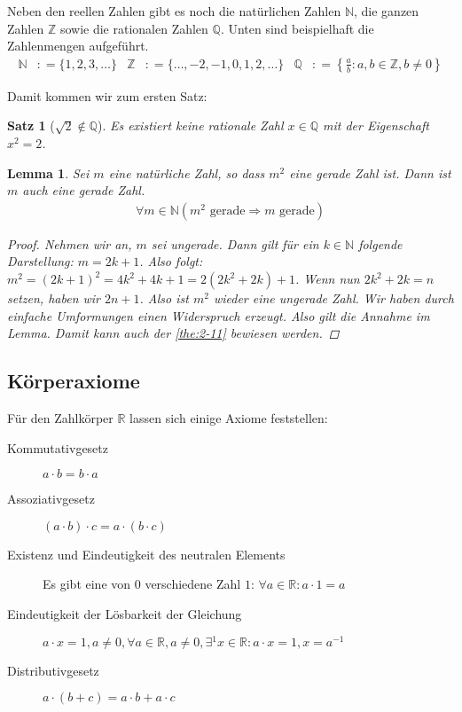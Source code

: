 \documentclass[ngerman,titlepage,twoside, parskip=half*]{scrreprt}
\newcommand*{\N}{\mathbb{N}}
\newcommand*{\Z}{\mathbb{Z}}
\newcommand*{\Q}{\mathbb{Q}}
\newcommand*{\R}{\mathbb{R}}
\theoremstyle{plain}
\newtheorem{lemma}{Lemma}
\newtheorem{theorem}{Satz}[section]
\theoremstyle{definition}
\theoremstyle{remark}
\newcommand*{\coloneqq}{\mathrel{\mathop:}=}
\begin{document}
Neben den reellen Zahlen gibt es noch die natürlichen Zahlen $\N$, die
ganzen Zahlen $\Z$ sowie die rationalen Zahlen $\Q$. Unten sind
beispielhaft die Zahlenmengen aufgeführt.
\begin{align*}
\N &\coloneqq \{1,2,3,\ldots\} &
\Z &\coloneqq \{\ldots ,-2,-1,0,1,2,\ldots\} &
\Q &\coloneqq \left\{\frac{a}{b}\colon a,b\in \Z, b \neq 0\right\}
\end{align*}

Damit kommen wir zum ersten Satz:
\begin{theorem}[$\sqrt{2}\notin \Q$]
  \label{the:2-11}
  Es existiert keine rationale Zahl $x\in \Q$ mit der Eigenschaft
  $x^2=2$.
\end{theorem}

\begin{lemma}
  Sei $m$ eine natürliche Zahl, so dass $m^2$ eine gerade Zahl
  ist. Dann ist $m$ auch eine gerade Zahl.
  \begin{gather*}\forall m \in \N (m^2 \text{ gerade}\Rightarrow m \text{ gerade})\end{gather*}
  \begin{proof}
    Nehmen wir an, $m$ sei ungerade. Dann gilt für ein $k \in\N$ folgende
    Darstellung: $m=2k+1$. Also folgt: $m^{2}= (2k+1)^{2} = 4k^{2}+ 4k+1=
    2(2k^{2}+2k)+1$. Wenn nun $2k^{2}+2k=n$ setzen, haben wir $2n+1$. Also ist
    $m^{2}$ wieder eine ungerade Zahl. Wir haben durch einfache Umformungen
    einen Widerspruch erzeugt. Also gilt die Annahme im Lemma. Damit
    kann auch der \autoref{the:2-11} bewiesen werden.
  \end{proof}
\end{lemma}

\subsection{Körperaxiome}

Für den Zahlkörper $\R$ lassen sich einige Axiome feststellen:

\begin{description}
\item[Kommutativgesetz] $a \cdot{} b = b \cdot{} a$
\item[Assoziativgesetz] $(a \cdot{} b) \cdot{} c = a \cdot{} (b
  \cdot{} c)$
\item[Existenz und Eindeutigkeit des neutralen Elements] Es gibt eine
  von $0$ verschiedene Zahl $1$: $\forall a \in \R \colon a \cdot 1 = a$
\item[Eindeutigkeit der Lösbarkeit der Gleichung] $a \cdot x = 1, a
  \neq 0, \forall a \in \R, a \neq 0, \exists{}^1 x \in \R \colon a \cdot x
  = 1, x = a^{-1}$
\item[Distributivgesetz] $a \cdot (b+c) = a \cdot b + a \cdot c$
\end{description}
\end{document}

